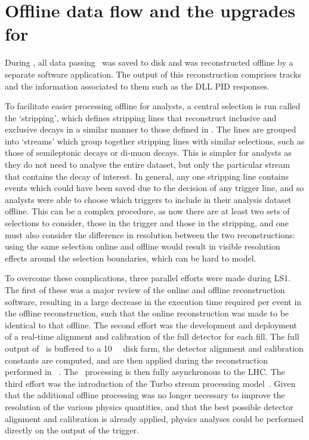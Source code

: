 \section{Offline data flow and the upgrades for \runtwo}
\label{chap:intro:lhcb:offline}

During \runone, all data passing \hlttwo\ was saved to disk and was 
reconstructed offline by a separate software application.
The output of this reconstruction comprises tracks and the information 
associated to them such as the \ac{DLL} \ac{PID} responses.

To facilitate easier processing offline for analysts, a central selection is 
run called the `stripping', which defines stripping lines that reconstruct 
inclusive and exclusive decays in a similar manner to those defined in \hlttwo.
The lines are grouped into `streams' which group together stripping lines with 
similar selections, such as those of semileptonic \PB decays or di-muon decays.
This is simpler for analysts as they do not need to analyse the entire dataset, 
but only the particular stream that contains the decay of interest.
In general, any one stripping line contains events which could have been saved 
due to the decision of any trigger line, and so analysts were able to choose 
which triggers to include in their analysis dataset offline.
This can be a complex procedure, as now there are at least two sets of 
selections to consider, those in the trigger and those in the stripping, and 
one must also consider the difference in resolution between the two 
reconstructions: using the same selection online and offline would result in 
visible resolution effects around the selection boundaries, which can be hard 
to model.

To overcome these complications, three parallel efforts were made during 
\ac{LS1}.
The first of these was a major review of the online and offline reconstruction 
software, resulting in a large decrease in the execution time required per 
event in the offline reconstruction, such that the online reconstruction was 
made to be identical to that offline.
The second effort was the development and deployment of a real-time alignment 
and calibration of the full detector for each fill.
The full output of \hltone\ is buffered to a \SI{10}{\peta\byte} disk farm, the 
detector alignment and calibration constants are computed, and are then applied 
during the reconstruction performed in \hlttwo~\cite{Dujany:082010}.
The \hlttwo\ processing is then fully asynchronous to the \ac{LHC}.
The third effort was the introduction of the Turbo stream processing 
model~\cite{Benson:2019752}.
Given that the additional offline processing was no longer necessary to improve 
the resolution of the various physics quantities, and that the best possible 
detector alignment and calibration is already applied, physics analyses could 
be performed directly on the output of the trigger.

